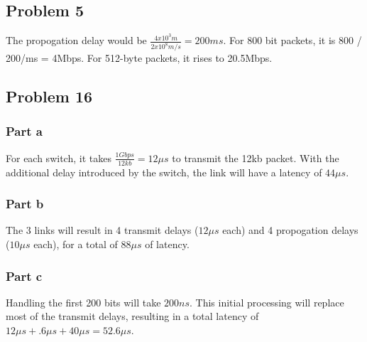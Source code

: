 \documentclass{article}%
\begin{document}
\subsection*{Problem 5}
The propogation delay would be $\frac{4x10^3m}{2x10^8m/s} = 200ms$. For 800 bit packets, it is 800 / 200/ms = 4Mbps. For 512-byte packets,
it rises to 20.5Mbps.


\subsection*{Problem 16}

\subsubsection*{Part a}

For each switch, it takes $\frac{1Gbps}{12kb} = 12\mu s$ to transmit the 12kb packet. With the additional delay introduced
by the switch, the link will have a latency of $44\mu s$.

\subsubsection*{Part b}

The 3 links will result in 4 transmit delays ($12\mu s$ each) and 4 propogation delays ($10\mu s$ each), for a total of
$88\mu s$ of latency.

\subsubsection*{Part c}

Handling the first 200 bits will take $200ns$. This initial processing will replace most of the transmit delays, resulting in a
total latency of $12\mu s + .6\mu s + 40\mu s = 52.6\mu s$.
\end{document}
